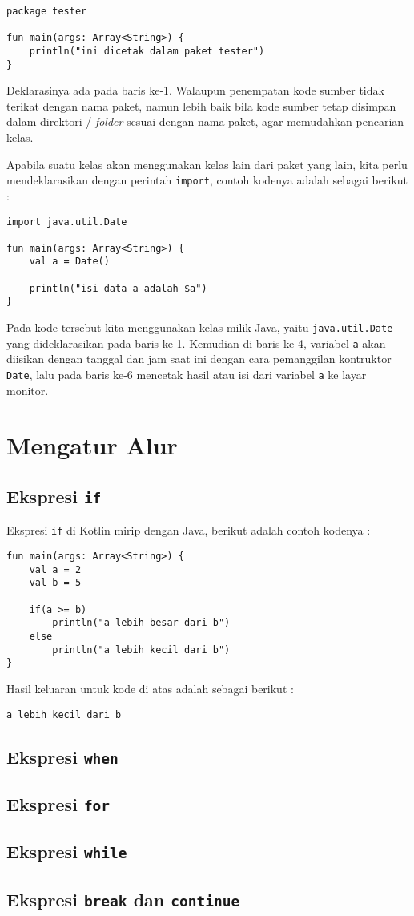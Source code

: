 \begin{lstlisting}
package tester

fun main(args: Array<String>) {
	println("ini dicetak dalam paket tester")
}
\end{lstlisting}

Deklarasinya ada pada baris ke-1. Walaupun penempatan kode sumber tidak terikat dengan nama paket, namun lebih baik bila kode sumber tetap disimpan dalam direktori / \textit{folder} sesuai dengan nama paket, agar memudahkan pencarian kelas.

Apabila suatu kelas akan menggunakan kelas lain dari paket yang lain, kita perlu mendeklarasikan dengan perintah \texttt{import}, contoh kodenya adalah sebagai berikut :

\begin{lstlisting}
import java.util.Date

fun main(args: Array<String>) {
	val a = Date()
	
	println("isi data a adalah $a")
}
\end{lstlisting}

Pada kode tersebut kita menggunakan kelas milik Java, yaitu \texttt{java.util.Date} yang dideklarasikan pada baris ke-1. Kemudian di baris ke-4, variabel \texttt{a} akan diisikan dengan tanggal dan jam saat ini dengan cara pemanggilan kontruktor \texttt{Date}, lalu pada baris ke-6 mencetak hasil atau isi dari variabel \texttt{a} ke layar monitor. 

\section{Mengatur Alur}

\subsection{Ekspresi \texttt{if}}

Ekspresi \texttt{if} di Kotlin mirip dengan Java, berikut adalah contoh kodenya :

\begin{lstlisting}
fun main(args: Array<String>) {
	val a = 2
	val b = 5
	
	if(a >= b)
		println("a lebih besar dari b")
	else
		println("a lebih kecil dari b")
}
\end{lstlisting}

Hasil keluaran untuk kode di atas adalah sebagai berikut :

\begin{lstlisting}
a lebih kecil dari b
\end{lstlisting}

\subsection{Ekspresi \texttt{when}}

\subsection{Ekspresi \texttt{for}}

\subsection{Ekspresi \texttt{while}}

\subsection{Ekspresi \texttt{break} dan \texttt{continue}}

